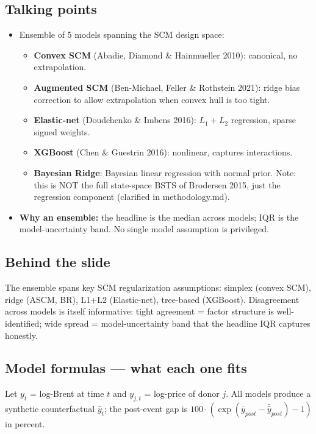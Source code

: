 \documentclass[11pt,a4paper]{article}
\newcommand{\highlight}[1]{\textcolor{accent}{\textbf{#1}}}
\begin{document}
\subsection{Talking points}
\begin{itemize}
  \item Ensemble of 5 models spanning the SCM design space:
  \begin{itemize}
    \item \textbf{Convex SCM} (Abadie, Diamond \& Hainmueller 2010): canonical, no extrapolation.
    \item \textbf{Augmented SCM} (Ben-Michael, Feller \& Rothstein 2021): ridge bias correction to allow extrapolation when convex hull is too tight.
    \item \textbf{Elastic-net} (Doudchenko \& Imbens 2016): $L_1+L_2$ regression, sparse signed weights.
    \item \textbf{XGBoost} (Chen \& Guestrin 2016): nonlinear, captures interactions.
    \item \textbf{Bayesian Ridge}: Bayesian linear regression with normal prior. Note: this is NOT the full state-space BSTS of Brodersen 2015, just the regression component (clarified in methodology.md).
  \end{itemize}
  \item \highlight{Why an ensemble:} the headline is the median across models; IQR is the model-uncertainty band. No single model assumption is privileged.
\end{itemize}

\subsection{Behind the slide}
The ensemble spans key SCM regularization assumptions: simplex (convex SCM), ridge (ASCM, BR), L1+L2 (Elastic-net), tree-based (XGBoost). Disagreement across models is itself informative: tight agreement = factor structure is well-identified; wide spread = model-uncertainty band that the headline IQR captures honestly.

\subsection{Model formulas --- what each one fits}

Let $y_t$ = log-Brent at time $t$ and $y_{j,t}$ = log-price of donor $j$. All models produce a synthetic counterfactual $\hat{y}_t$; the post-event gap is $100 \cdot (\exp(\bar{y}_{post} - \bar{\hat{y}}_{post}) - 1)$ in percent.
\end{document}
